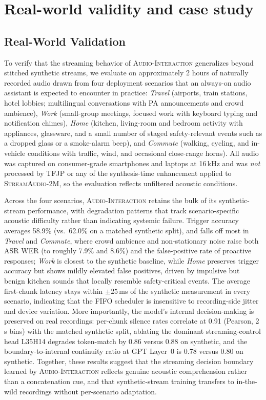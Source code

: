 \documentclass{llmxive}
\begin{document}
 





\appendix


\section{Real-world validity and case study}
\subsection{Real-World Validation}
\label{appendix:realworld}

To verify that the streaming behavior of \textsc{Audio-Interaction} generalizes beyond stitched synthetic streams, we evaluate on approximately 2 hours of naturally recorded audio drawn from four deployment scenarios that an always-on audio assistant is expected to encounter in practice: \textit{Travel} (airports, train stations, hotel lobbies; multilingual conversations with PA announcements and crowd ambience), \textit{Work} (small-group meetings, focused work with keyboard typing and notification chimes), \textit{Home} (kitchen, living-room and bedroom activity with appliances, glassware, and a small number of staged safety-relevant events such as a dropped glass or a smoke-alarm beep), and \textit{Commute} (walking, cycling, and in-vehicle conditions with traffic, wind, and occasional close-range horns). All audio was captured on consumer-grade smartphones and laptops at 16\,kHz and was \emph{not} processed by TFJP or any of the synthesis-time enhancement applied to \textsc{StreamAudio-2M}, so the evaluation reflects unfiltered acoustic conditions.

Across the four scenarios, \textsc{Audio-Interaction} retains the bulk of its synthetic-stream performance, with degradation patterns that track scenario-specific acoustic difficulty rather than indicating systemic failure. Trigger accuracy averages 58.9\% (vs.\ 62.0\% on a matched synthetic split), and falls off most in \textit{Travel} and \textit{Commute}, where crowd ambience and non-stationary noise raise both ASR WER (to roughly 7.9\% and 8.6\%) and the false-positive rate of proactive responses; \textit{Work} is closest to the synthetic baseline, while \textit{Home} preserves trigger accuracy but shows mildly elevated false positives, driven by impulsive but benign kitchen sounds that locally resemble safety-critical events. The average first-chunk latency stays within $\pm 25$\,ms of the synthetic measurement in every scenario, indicating that the FIFO scheduler is insensitive to recording-side jitter and device variation. More importantly, the model's internal decision-making is preserved on real recordings: per-chunk silence rates correlate at 0.91 (Pearson, 2\,s bins) with the matched synthetic split, ablating the dominant streaming-control head L35H14 degrades token-match by 0.86 versus 0.88 on synthetic, and the boundary-to-internal continuity ratio at GPT Layer~0 is 0.78 versus 0.80 on synthetic. Together, these results suggest that the streaming decision boundary learned by \textsc{Audio-Interaction} reflects genuine acoustic comprehension rather than a concatenation cue, and that synthetic-stream training transfers to in-the-wild recordings without per-scenario adaptation.
\end{document}
